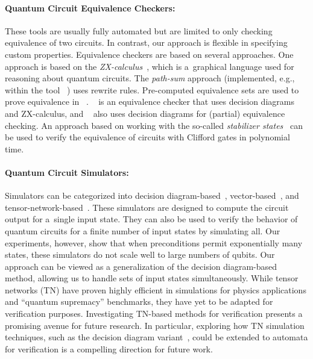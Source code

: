 \paragraph{Quantum Circuit Equivalence Checkers:} These tools
are usually fully automated but are limited to only checking equivalence of two circuits.
In contrast, our approach is flexible in specifying custom properties.
Equivalence checkers are based on several approaches.
One approach is based on the \emph{ZX-calculus}~\cite{Coecke_2011}, which is a~graphical language used for reasoning about quantum circuits.
The \emph{path-sum} approach (implemented, e.g., within the tool
\feynman~\cite{amy2018towards}) uses rewrite rules.
Pre-computed equivalence sets are used to prove equivalence in
\quartz~\cite{xu2022quartz}.
\qcec~\cite{burgholzer2020advanced} is an equivalence checker that uses decision
diagrams and ZX-calculus, and \sliqec~\cite{ChenJH22,WeiTJJ22} also uses decision
diagrams for (partial) equivalence checking.
An approach based on working with the so-called \emph{stabilizer
states}~\cite{ThanosCL23} can be used to verify the equivalence of circuits with
Clifford gates in polynomial time. 

\paragraph{Quantum Circuit Simulators:} Simulators can be categorized into decision diagram-based~\cite{TsaiJJ21,ZulehnerW19,SistlaCR23,MillerT06}, vector-based~\cite{li2021svsim}, 
and tensor-network-based~\cite{markov2008simulating,PhysRevLett.91.147902}.
These simulators are designed to compute the circuit output for a~single input state. They can also be used to verify the behavior of quantum circuits for a finite number of input states by simulating all.
Our experiments, however, show that when preconditions permit exponentially many
states, these simulators do not scale well to large numbers of qubits.
Our approach can be viewed as a generalization of the decision diagram-based method, allowing us to handle sets of input states simultaneously. While tensor networks (TN) have proven highly efficient in simulations for physics applications and ``quantum supremacy'' benchmarks, they have yet to be adapted for verification purposes. Investigating TN-based methods for verification presents a promising avenue for future research. In particular, exploring how TN simulation techniques, such as the decision diagram variant~\cite{HongZLFY22}, could be extended to automata for verification is a compelling direction for future work.

